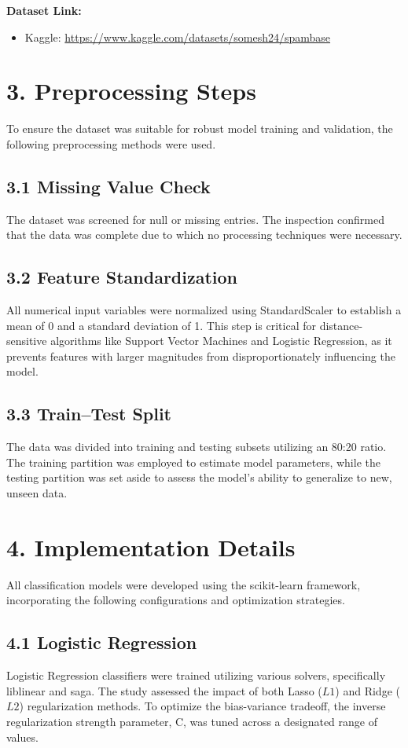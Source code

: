 \documentclass[11pt]{article}
\begin{document}
\textbf{Dataset Link:}
\begin{itemize}
    \item Kaggle: \href{https://www.kaggle.com/datasets/somesh24/spambase}{https://www.kaggle.com/datasets/somesh24/spambase}
\end{itemize}

\section*{3. Preprocessing Steps}

To ensure the dataset was suitable for robust model training and validation, the following preprocessing methods were used.

\subsection*{3.1 Missing Value Check}
The dataset was screened for null or missing entries. The inspection confirmed that the data was complete due to which no processing techniques were necessary.

\subsection*{3.2 Feature Standardization}
All numerical input variables were normalized using StandardScaler to establish a mean of 0 and a standard deviation of 1. This step is critical for distance-sensitive algorithms like Support Vector Machines and Logistic Regression, as it prevents features with larger magnitudes from disproportionately influencing the model.

\subsection*{3.3 Train--Test Split}
The data was divided into training and testing subsets utilizing an 80:20 ratio. The training partition was employed to estimate model parameters, while the testing partition was set aside to assess the model's ability to generalize to new, unseen data.

\section*{4. Implementation Details}
All classification models were developed using the scikit-learn framework, incorporating the following configurations and optimization strategies.

\subsection*{4.1 Logistic Regression}
Logistic Regression classifiers were trained utilizing various solvers, specifically liblinear and saga. The study assessed the impact of both Lasso ($L1$) and Ridge ($L2$) regularization methods. To optimize the bias-variance tradeoff, the inverse regularization strength parameter, C, was tuned across a designated range of values.
\end{document}
